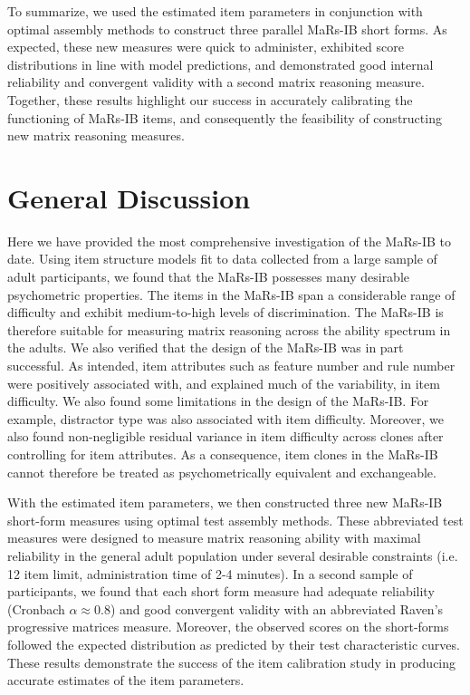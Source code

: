 \documentclass[a4paper,man,natbib]{apa6}
\begin{document}
To summarize, we used the estimated item parameters in conjunction with optimal assembly methods to construct three parallel MaRs-IB short forms. As expected, these new measures were quick to administer, exhibited score distributions in line with model predictions, and demonstrated good internal reliability and convergent validity with a second matrix reasoning measure. Together, these results highlight our success in accurately calibrating the functioning of MaRs-IB items, and consequently the feasibility of constructing new matrix reasoning measures.

\section{General Discussion}

Here we have provided the most comprehensive investigation of the MaRs-IB to date. Using item structure models fit to data collected from a large sample of adult participants, we found that the MaRs-IB possesses many desirable psychometric properties. The items in the MaRs-IB span a considerable range of difficulty and exhibit medium-to-high levels of discrimination. The MaRs-IB is therefore suitable for measuring matrix reasoning across the ability spectrum in the adults. We also verified that the design of the MaRs-IB was in part successful. As intended, item attributes such as feature number and rule number were positively associated with, and explained much of the variability, in item difficulty. We also found some limitations in the design of the MaRs-IB. For example, distractor type was also associated with item difficulty. Moreover, we also found non-negligible residual variance in item difficulty across clones after controlling for item attributes. As a consequence, item clones in the MaRs-IB cannot therefore be treated as psychometrically equivalent and exchangeable. 

With the estimated item parameters, we then constructed three new MaRs-IB short-form measures using optimal test assembly methods. These abbreviated test measures were designed to measure matrix reasoning ability with maximal reliability in the general adult population under several desirable constraints (i.e. 12 item limit, administration time of 2-4 minutes). In a second sample of participants, we found that each short form measure had adequate reliability (Cronbach $\alpha \approx 0.8$) and good convergent validity with an abbreviated Raven's progressive matrices measure. Moreover, the observed scores on the short-forms followed the expected distribution as predicted by their test characteristic curves. These results demonstrate the success of the item calibration study in producing accurate estimates of the item parameters. 
\end{document}
